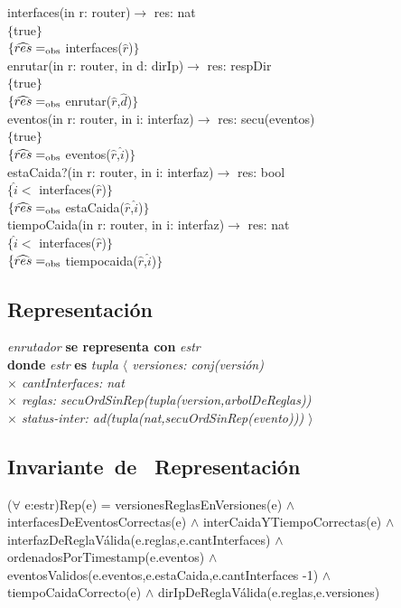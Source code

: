 interfaces(in r: router)$\longrightarrow$ res: nat\\
$\{$true$\}$\\
$\{\widehat{res} =_{\mathrm{obs}}$ interfaces($\widehat{r}$)$\}$\\

enrutar(in r: router, in d: dirIp)$\longrightarrow$ res: respDir\\
$\{$true$\}$\\
$\{\widehat{res} =_{\mathrm{obs}}$ enrutar($\widehat{r}$,$\widehat{d}$)$\}$\\

eventos(in r: router, in i: interfaz)$\longrightarrow$ res: secu(eventos)\\
$\{$true$\}$\\
$\{\widehat{res} =_{\mathrm{obs}}$ eventos($\widehat{r}$,$\widehat{i}$)$\}$\\

estaCaida?(in r: router, in i: interfaz)$\longrightarrow$ res: bool\\
$\{\widehat{i} <$ interfaces($\widehat{r}$)$\}$\\
$\{\widehat{res} =_{\mathrm{obs}}$ estaCaida($\widehat{r}$,$\widehat{i}$)$\}$\\

tiempoCaida(in r: router, in i: interfaz)$\longrightarrow$ res: nat\\
$\{\widehat{i} <$ interfaces($\widehat{r}$)$\}$\\
$\{\widehat{res} =_{\mathrm{obs}}$ tiempocaida($\widehat{r}$,$\widehat{i}$)$\}$\\


\subsection*{Representaci\'on}
\textit{enrutador} \textbf{se representa con} \textit{estr}\\
\textbf{donde} \textit{estr} \textbf{es} \textit{tupla $\langle$ versiones: conj(versi\'on)\\
\hspace*{3.5cm} $\times$  cantInterfaces: nat\\
\hspace*{3.5cm} $\times$  reglas: secuOrdSinRep(tupla(version,arbolDeReglas))\\ 
\hspace*{3.5cm} $\times$  status-inter: ad(tupla(nat,secuOrdSinRep(evento))) $\rangle$}


\subsection*{Invariante\ de \ Representaci\'on}
\textbf{} 
($\forall$ e:estr)Rep(e) = 
versionesReglasEnVersiones(e)
$\wedge$ interfacesDeEventosCorrectas(e)
$\wedge$ interCaidaYTiempoCorrectas(e) 
$\wedge$ interfazDeReglaV\'alida(e.reglas,e.cantInterfaces)
$\wedge$ ordenadosPorTimestamp(e.eventos)
$\wedge$ eventosValidos(e.eventos,e.estaCaida,e.cantInterfaces -1)
$\wedge$ tiempoCaidaCorrecto(e)  
$\wedge$ dirIpDeReglaV\'alida(e.reglas,e.versiones)\\

